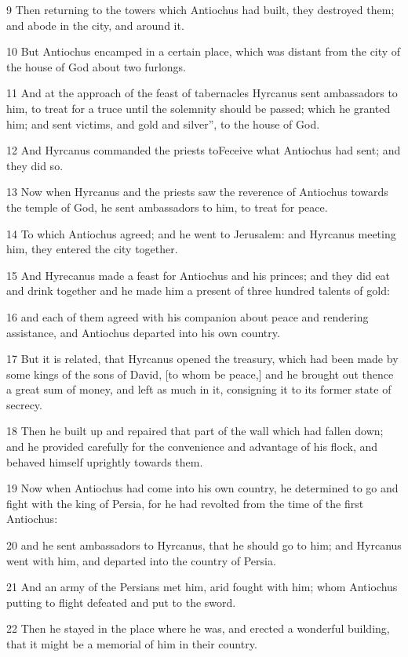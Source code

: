 9 Then returning to the towers which Antiochus had built, they destroyed them; and abode in the city, and around it. 

10 But Antiochus encamped in a certain place, which was distant from the city of the house of God about two furlongs. 

11 And at the approach of the feast of tabernacles Hyrcanus sent ambassadors to him, to treat for a truce until the solemnity should be passed; which he granted him; and sent victims, and gold and silver”, to the house of God. 

12 And Hyrcanus commanded the priests toFeceive what Antiochus had sent; and they did so. 

13 Now when Hyrcanus and the priests saw the reverence of Antiochus towards the temple of God, he sent ambassadors to him, to treat for peace. 

14 To which Antiochus agreed; and he went to Jerusalem: and Hyrcanus meeting him, they entered the city together. 

15 And Hyrecanus made a feast for Antiochus and his princes; and they did eat and drink together and he made him a present of three hundred talents of gold: 

16 and each of them agreed with his companion about peace and rendering assistance, and Antiochus departed into his own country. 

17 But it is related, that Hyrcanus opened the treasury, which had been made by some kings of the sons of David, [to whom be peace,] and he brought out thence a great sum of money, and left as much in it, consigning it to its former state of secrecy. 

18 Then he built up and repaired that part of the wall which had fallen down; and he provided carefully for the convenience and advantage of his flock, and behaved himself uprightly towards them. 

19 Now when Antiochus had come into his own country, he determined to go and fight with the king of Persia, for he had revolted from the time of the first Antiochus: 

20 and he sent ambassadors to Hyrcanus, that he should go to him; and Hyrcanus went with him, and departed into the country of Persia. 

21 And an army of the Persians met him, arid fought with him; whom Antiochus putting to flight defeated and put to the sword. 

22 Then he stayed in the place where he was, and erected a wonderful building, that it might be a memorial of him in their country. 

